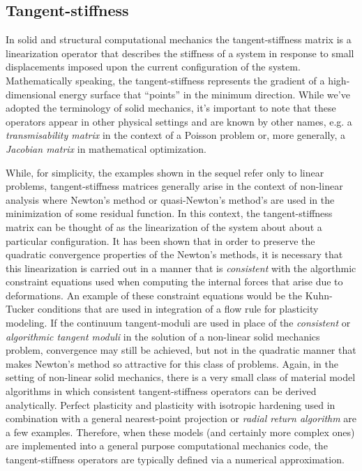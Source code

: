 \documentclass[preprint,12pt]{elsarticle}
\begin{document}
\subsection{Tangent-stiffness} 

In solid and structural computational mechanics the tangent-stiffness matrix is a linearization operator that describes the stiffness of a system in response to small displacements imposed upon the current configuration of the system.  Mathematically speaking, the tangent-stiffness represents the gradient of a high-dimensional energy surface that ``points'' in the minimum direction. While we've adopted the terminology of solid mechanics, it's important to note that these operators appear in other physical settings and are known by other names, e.g. a \emph{transmisability matrix} in the context of a Poisson problem or, more generally, a \emph{Jacobian matrix} in mathematical optimization.

While, for simplicity, the examples shown in the sequel refer only to linear problems, tangent-stiffness matrices generally arise in the context of non-linear analysis where Newton's method or quasi-Newton's method's are used in the minimization of some residual function.  In this context, the tangent-stiffness matrix can be thought of as the linearization of the system about about a particular configuration.  It has been shown \cite{hughes1978consistent, hughes1978unconditionally} that in order to preserve the quadratic convergence properties of the Newton's methods, it is necessary that this linearization is carried out in a manner that is \emph{consistent} with the algorthmic constraint equations used when computing the internal forces that arise due to deformations.  An example of these constraint equations would be the Kuhn-Tucker conditions \cite{simo1998} that are used in integration of a flow rule for plasticity modeling.  If the continuum tangent-moduli are used in place of the \emph{consistent} or \emph{algorithmic tangent moduli} in the solution of a non-linear solid mechanics problem, convergence may still be achieved, but not in the quadratic manner that makes Newton's method so attractive for this class of problems.  Again, in the setting of non-linear solid mechanics, there is a very small class of material model algorithms in which consistent tangent-stiffness operators can be derived analytically.  Perfect plasticity and plasticity with isotropic hardening used in combination with a general nearest-point projection or \emph{radial return algorithm} are a few examples.  Therefore, when these models (and certainly more complex ones) are implemented into a general purpose computational mechanics code, the tangent-stiffness operators are typically defined via a numerical approximation.
\end{document}

